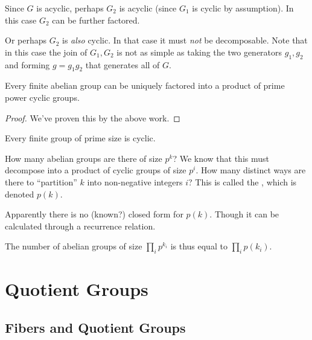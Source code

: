 \documentclass[11pt, oneside]{amsart}
\begin{document}
\begin{remark}
  Since $G$ is acyclic, perhaps $G_2$ is acyclic (since $G_1$ is cyclic
  by assumption). In this case $G_2$ can be further factored.

  Or perhaps $G_2$ is \emph{also} cyclic. In that case it must
  \emph{not} be decomposable. Note that in this case the join of $G_1,
  G_2$ is not as simple as taking the two generators $g_1, g_2$ and
  forming $g = g_1 g_2$ that generates all of $G$.
\end{remark}

\begin{theorem}

  Every finite abelian group can be uniquely factored into a product of
  prime power cyclic groups.
\end{theorem}

\begin{proof}
  We've proven this by the above work.
\end{proof}

\begin{corollary}
  Every finite group of prime size is cyclic.
\end{corollary}

\begin{remark}
  How many abelian groups are there of size $p^k$? We know that this
  must decompose into a product of cyclic groups of size $p^i$. How many
  distinct ways are there to ``partition'' $k$ into non-negative
  integers $i$? This is called the , which is
  denoted $p(k)$.

  Apparently there is no (known?) closed form for $p(k)$. Though it can
  be calculated through a recurrence relation.
\end{remark}

\begin{remark}
  The number of abelian groups of size $\prod_i p^{k_i}$ is thus equal
  to $\prod_i p(k_i)$.
\end{remark}

\section{Quotient Groups}

\subsection{Fibers and Quotient Groups}
\end{document}
